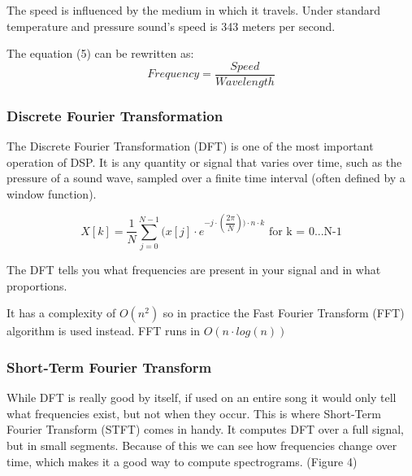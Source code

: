 The speed is influenced by the medium in which it travels. Under standard temperature and pressure sound's speed is 343 meters per second. \cite{speed_of_sound}

The equation (5) can be rewritten as:
\begin{equation}
Frequency = \dfrac{Speed}{Wavelength}
\end{equation}


\subsubsection{Discrete Fourier Transformation}
The Discrete Fourier Transformation (DFT) is one of the most important operation of DSP. It is any quantity or signal that varies over time, such as the pressure of a sound wave, sampled over a finite time interval (often defined by a window function). \cite{discrete} \par

\begin{equation}
X[k] = \dfrac{1}{N} \sum_{j=0}^{N-1}(x[j] \cdot e^ {-j \cdot( \dfrac{2\pi}{N}) ) \cdot n \cdot k }  \text{ for k = 0...N-1}
\end{equation}

The DFT tells you what frequencies are present in your signal and in what proportions.
\par
It has a complexity of $O(n^2)$ so in practice the Fast Fourier Transform (FFT) algorithm is used instead. FFT runs in $O(n\cdot log(n))$

\subsubsection{Short-Term Fourier Transform}
While DFT is really good by itself, if used on an entire song it would only tell what frequencies exist, but not when they occur. This is where Short-Term Fourier Transform (STFT) comes in handy. It computes DFT over a full signal, but in small segments. Because of this we can see how frequencies change over time, which makes it a good way to compute spectrograms. (Figure 4) 

